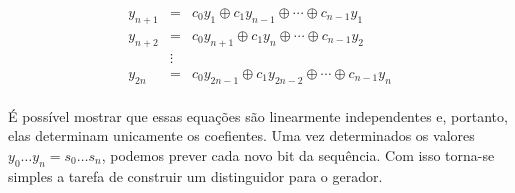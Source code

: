 \begin{displaymath}
  \begin{array}{rcl}
    y_{n+1} & = & c_0y_1 \oplus c_1y_{n-1} \oplus \cdots \oplus c_{n-1} y_1 \\
    y_{n+2} & = & c_0y_{n+1} \oplus c_1y_n \oplus \cdots \oplus c_{n-1} y_2 \\
    & \vdots & \\
    y_{2n} & = & c_0y_{2n-1} \oplus c_1y_{2n-2} \oplus \cdots \oplus c_{n-1} y_n \\
  \end{array}
\end{displaymath}

É possível mostrar que essas equações são linearmente independentes e, portanto, elas determinam unicamente os coefientes.
Uma vez determinados os valores $y_0 \dots y_n = s_0 \dots s_n$, podemos prever cada novo bit da sequência.
Com isso torna-se simples a tarefa de construir um distinguidor para o gerador.

